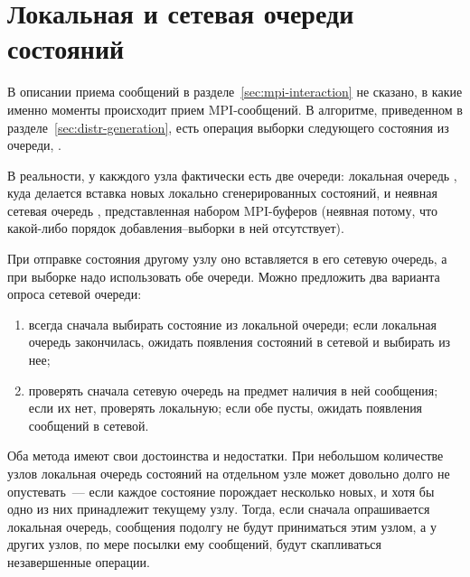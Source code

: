     

\section{Локальная и сетевая очереди состояний}
\label{sec:local-network-queue}

В описании приема сообщений в разделе~\ref{sec:mpi-interaction} не сказано, в какие именно
моменты происходит прием MPI-сообщений. В алгоритме, приведенном в
разделе~\ref{sec:distr-generation}, есть операция выборки следующего состояния из очереди,
.

В реальности, у какждого узла фактически есть две очереди: локальная очередь
, куда делается вставка новых локально сгенерированных состояний, и
неявная сетевая очередь , представленная набором MPI-буферов (неявная
потому, что какой-либо порядок добавления--выборки в ней отсутствует).

При отправке состояния другому узлу оно вставляется в его сетевую очередь, а при выборке
надо использовать обе очереди. Можно предложить два варианта опроса сетевой очереди:
\begin{enumerate}
\item всегда сначала выбирать состояние из локальной очереди; если локальная очередь
  закончилась, ожидать появления состояний в сетевой и выбирать из нее;
\item проверять сначала сетевую очередь на предмет наличия в ней сообщения; если их нет,
  проверять локальную; если обе пусты, ожидать появления сообщений в сетевой.
\end{enumerate}

Оба метода имеют свои достоинства и недостатки. При небольшом количестве узлов локальная
очередь состояний на отдельном узле может довольно долго не опустевать~--- если каждое
состояние порождает несколько новых, и хотя бы одно из них принадлежит текущему
узлу. Тогда, если сначала опрашивается локальная очередь, сообщения подолгу не будут
приниматься этим узлом, а у других узлов, по мере посылки ему сообщений, будут
скапливаться незавершенные операции.

